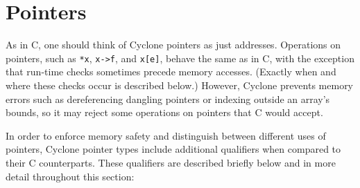 \section{Pointers}
\label{sec:pointers}

As in C, one should think of Cyclone pointers as just addresses.  
Operations on pointers,
such as \texttt{*x}, \texttt{x->f}, and \texttt{x[e]}, behave the same
as in C, with the exception that run-time checks sometimes precede
memory accesses.  (Exactly when and where these checks occur is
described below.)  However, Cyclone prevents memory errors such as
dereferencing dangling pointers or indexing outside an array's bounds, 
so it may reject some operations on pointers that C would accept.

In order to enforce memory safety and distinguish between different
uses of pointers, Cyclone pointer types include additional qualifiers
when compared to their C counterparts.  These qualifiers are 
described briefly below and in more detail throughout this section:

